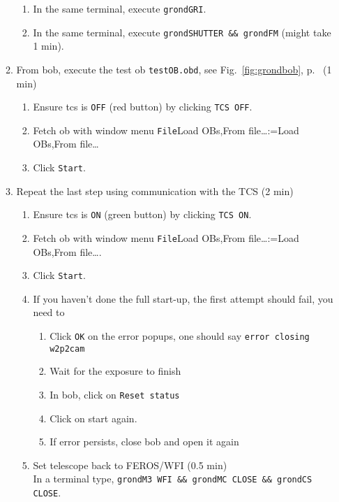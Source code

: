 \documentclass[11pt,fleqn]{book}
\makeatletter
\def\menu#1#2{\texttt{#1}\ifx{}#2\else\@for\@x:=#2\do{$\rightarrow$\texttt{\@x}}\fi}
\def\wmenu#1#2{window menu \menu{#1}{#2}}
\def\figref#1{Fig.~\ref{fig:#1}, p.~\pageref{fig:#1}}
\makeatother
\begin{document}
\begin{enumerate}
\begin{enumerate}
\begin{enumerate}
             \item In the same terminal, execute \texttt{grondGRI}.
             \item In the same terminal, execute \texttt{grondSHUTTER \&\& grondFM} (might take 1 min).
           \end{enumerate}
         \item From \gls{bob}, execute the test \gls{ob} \texttt{testOB.obd}, see \figref{grondbob} (1 min)
           \begin{enumerate}
             \item Ensure \gls{tcs} is \texttt{OFF} (red button) by clicking \texttt{TCS OFF}.
             \item Fetch \gls{ob} with \wmenu{File}{Load OBs,From file…} 
             \item Click \texttt{Start}.
           \end{enumerate}
         \item Repeat the last step using communication with the TCS (2 min)\label{list:grond-testtcs}
           \begin{enumerate}
             \item Ensure \gls{tcs} is \texttt{ON} (green button) by clicking \texttt{TCS ON}.
             \item Fetch \gls{ob} with \wmenu{File}{Load OBs,From file…}.
             \item Click \texttt{Start}.
             \item If you haven't done the full start-up, the first attempt should fail, you need to
             \begin{enumerate}
                \item Click \texttt{OK} on the error popups, one should say \texttt{error closing w2p2cam}
                \item Wait for the exposure to finish
                \item In \gls{bob}, click on \texttt{Reset status}
                \item Click on start again.
                \item If error persists, close \gls{bob} and open it again
             \end{enumerate} 
             \item Set telescope back to FEROS/WFI (0.5 min)\\
             In a terminal type, \texttt{grondM3 WFI \&\& grondMC CLOSE \&\& grondCS CLOSE}.
           \end{enumerate}

\end{enumerate}
\end{enumerate}
\end{document}
